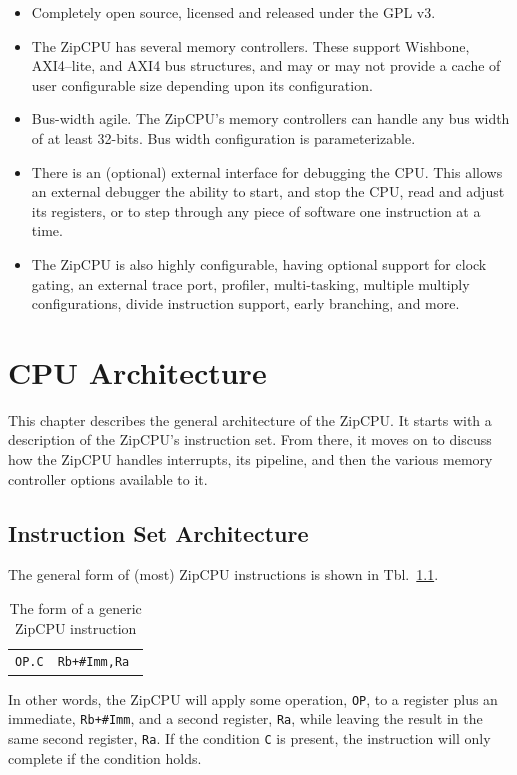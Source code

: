 \documentclass{gqtekspec}
\begin{document}
\begin{itemize}
\item Completely open source, licensed and released under the GPL v3.

\item The ZipCPU has several memory controllers.  These support Wishbone,
	AXI4--lite, and AXI4 bus structures, and may or may not provide a
	cache of user configurable size depending upon its configuration.

\item Bus-width agile.  The ZipCPU's memory controllers can handle any bus
	width of at least 32-bits.  Bus width configuration is parameterizable.

\item There is an (optional) external interface for debugging the CPU.  This
	allows an external debugger the ability to start, and stop the CPU,
	read and adjust its registers, or to step through any piece of software
	one instruction at a time.

\item The ZipCPU is also highly configurable, having optional support for
	clock gating, an external trace port, profiler, 
	multi-tasking, multiple multiply configurations, divide instruction
	support, early branching, and more.
\end{itemize}
\chapter{CPU Architecture}\label{chap:arch}
This chapter describes the general architecture of the ZipCPU.  It starts
with a description of the ZipCPU's instruction set.  From there, it moves
on to discuss how the ZipCPU handles interrupts, its pipeline, and then
the various memory controller options available to it.

\section{Instruction Set Architecture}\label{sec:isa}
The general form of (most) ZipCPU instructions is shown in
Tbl.~\ref{tbl:gen-insn}.
\begin{table}\begin{center}
\begin{tabular}{ll}
	{\tt OP.C}&{\tt Rb+\#Imm,Ra } \\
\end{tabular}%
\caption{The form of a generic ZipCPU instruction}\label{tbl:gen-insn}%
\end{center}\end{table}
In other words, the ZipCPU will apply some operation, {\tt OP}, to a register
plus an immediate, {\tt Rb+\#Imm}, and a second register, {\tt Ra},
while leaving the result in the same second register, {\tt Ra}.  If the
condition {\tt C} is present, the instruction will only complete if the
condition holds.
\end{document}

